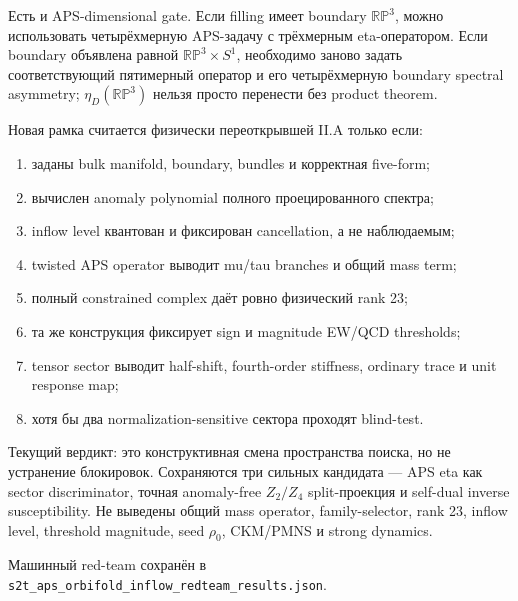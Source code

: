 Есть и APS-dimensional gate. Если filling имеет boundary
\(\mathbb{RP}^3\), можно использовать четырёхмерную APS-задачу с
трёхмерным eta-оператором. Если boundary объявлена равной
\(\mathbb{RP}^3\times S^1\), необходимо заново задать соответствующий
пятимерный оператор и его четырёхмерную boundary spectral asymmetry;
\(\eta_D(\mathbb{RP}^3)\) нельзя просто перенести без product theorem.

\begin{protocol}
Новая рамка считается физически переоткрывшей II.A только если:
\begin{enumerate}
 \item заданы bulk manifold, boundary, bundles и корректная five-form;
 \item вычислен anomaly polynomial полного проецированного спектра;
 \item inflow level квантован и фиксирован cancellation, а не наблюдаемым;
 \item twisted APS operator выводит mu/tau branches и общий mass term;
 \item полный constrained complex даёт ровно физический rank 23;
 \item та же конструкция фиксирует sign и magnitude EW/QCD thresholds;
 \item tensor sector выводит half-shift, fourth-order stiffness, ordinary
 trace и unit response map;
 \item хотя бы два normalization-sensitive сектора проходят blind-test.
\end{enumerate}
\end{protocol}

Текущий вердикт: это конструктивная смена пространства поиска, но не
устранение блокировок. Сохраняются три сильных кандидата --- APS eta как
sector discriminator, точная anomaly-free \(Z_2/Z_4\) split-проекция и
self-dual inverse susceptibility. Не выведены общий mass operator,
family-selector, rank 23, inflow level, threshold magnitude, seed
\(\rho_0\), CKM/PMNS и strong dynamics.

Машинный red-team сохранён в
\texttt{s2t\_aps\_orbifold\_inflow\_redteam\_results.json}.